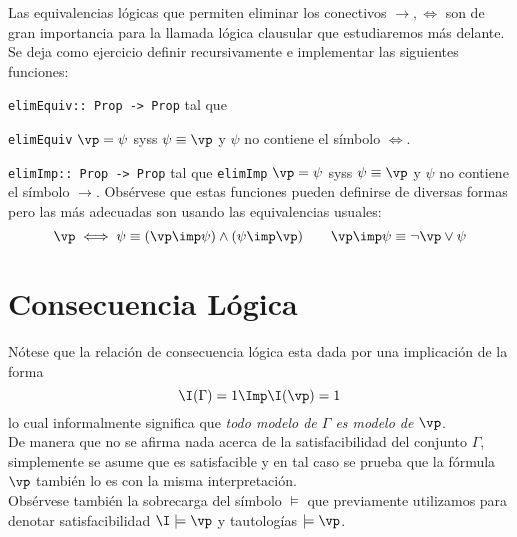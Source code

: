 \documentclass[11pt,letterpaper]{article}
\begin{document}
Las equivalencias l\'ogicas que permiten eliminar los conectivos $\to,\iff$ son 
de gran importancia para la llamada l\'ogica clausular que estudiaremos m\'as 
delante. Se deja como ejercicio definir recursivamente e implementar las 
siguientes funciones:
\bi
\item \verb~elimEquiv:: Prop -> Prop~ tal que
\begin{center}
\verb~elimEquiv~ $\vp = \psi$ syss  $\psi\equiv\vp$ y $\psi$ no 
contiene el s\'imbolo $\iff$.
\end{center}

\item \verb~elimImp:: Prop -> Prop~ tal que
\bc
\verb~elimImp~ $\vp = \psi$ syss $\psi\equiv\vp$ y $\psi$ no contiene el 
s\'imbolo $\to$.
\ec
\ei
Obs\'ervese que estas funciones pueden definirse de diversas formas pero las 
m\'as adecuadas son usando las equivalencias usuales:
$$ \vp\iff\psi\equiv (\vp \imp \psi) \land (\psi \imp \vp)\qquad 
\vp\imp\psi\equiv \lnot\vp\lor\psi $$



\section{Consecuencia L\'ogica}

\noindent
N\'otese que la relaci\'on de consecuencia l\'ogica esta dada por una 
implicaci\'on de la forma 
$$ \I(\Gamma)=1\Imp\I(\vp)=1 $$
lo cual informalmente significa que 
\emph{todo modelo de $\Gamma$ es modelo de $\vp$}.\\
De manera que no se afirma nada acerca de la satisfacibilidad del conjunto
$\Gamma$, simplemente se asume que es satisfacible y en tal caso se prueba que
la f\'ormula $\vp$ tambi\'en lo es con la misma interpretaci\'on.\\
  
Obs\'ervese tambi\'en la sobrecarga del s\'imbolo $\models$ que previamente 
utilizamos para denotar satisfacibilidad  $\I\models\vp$ y tautolog\'ias 
$\models\vp$.
\end{document}
